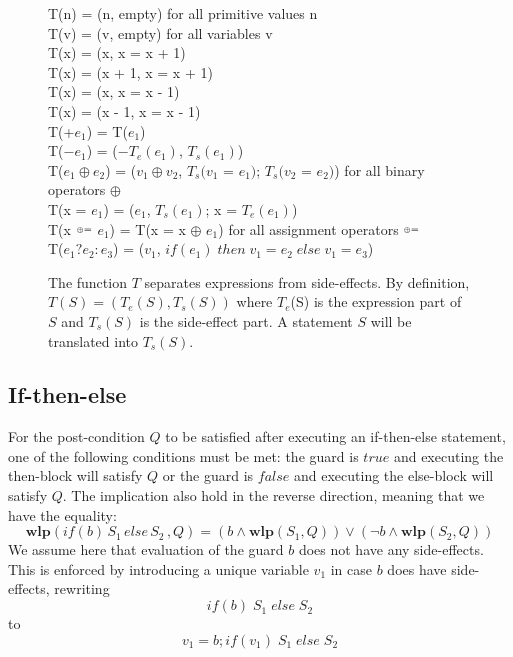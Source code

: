 \documentclass[a4paper, fleqn]{article}
\newcommand{\pp}{\raisebox{.4ex}{\tiny\bf +}\nolinebreak\hspace{-.10em}\raisebox{.4ex}{\tiny\bf +}}
\newcommand{\mm}{\raisebox{.4ex}{\tiny\bf -}\nolinebreak\raisebox{.4ex}{\tiny\bf -}}
\newcommand{\oplusis}{\raisebox{.4ex}{\tiny\bf $\oplus$}\nolinebreak\raisebox{.4ex}{\tiny\bf =}}
\newcommand{\wlp}{\textbf{wlp}\xspace}
\newcommand{\stab}{\tabto*{60pt}}
\begin{document}
\begin{figure}
T(n) \stab= (n, empty) \hfill for all primitive values n \\
T(v) \stab= (v, empty) \hfill for all variables v \\
T(x\pp) \stab= (x, x = x + 1) \\
T(\pp x) \stab= (x + 1, x = x + 1) \\
T(x\mm) \stab= (x, x = x - 1) \\
T(\mm x) \stab= (x - 1, x = x - 1) \\
T(+$e_1$) \stab= T($e_1$) \\
T($-e_1$) \stab= ($-T_e(e_1)$, $T_s(e_1)$) \\
T($e_1 \oplus e_2$) \stab= ($v_1 \oplus v_2$, $T_s(v_1$ = $e_1)$; $T_s(v_2$ = $e_2)$) \hfill for all binary operators $\oplus$\\
T(x = $e_1$) \stab= ($e_1$, $T_s(e_1)$; x = $T_e(e_1)$)\\
T(x $\oplusis$ $e_1$) \stab= T(x = x $\oplus$ $e_1$) \hfill for all assignment operators $\oplusis$\\
T($e_1?e_2:e_3$) \stab= ($v_1$, $if(e_1) \; then \; v_1 = e_2 \; else \; v_1 = e_3$)
\caption{The function $T$ separates expressions from side-effects. By definition, $T(S) = (T_e(S), T_s(S))$ where $T_e$(S) is the expression part of $S$ and $T_s(S)$ is the side-effect part. A statement $S$ will be translated into $T_s(S)$.}
\label{expressions}
\end{figure}

\subsection{If-then-else}
For the post-condition $Q$ to be satisfied after executing an if-then-else statement, one of the following conditions must be met: the guard is $true$ and executing the then-block will satisfy $Q$ or the guard is $false$ and executing the else-block will satisfy $Q$. The implication also hold in the reverse direction, meaning that we have the equality: \[\wlp(if(b)\, S_1\,else \, S_2\,, Q) = (b \land \wlp(S_1, Q)) \lor (\neg b \land \wlp(S_2, Q))\] We assume here that evaluation of the guard $b$ does not have any side-effects. This is enforced by introducing a unique variable $v_1$ in case $b$ does have side-effects, rewriting \[if(b)\; S_1\;else \; S_2\] to \[v_1 = b;if(v_1)\; S_1\; else \; S_2\]
\end{document}
